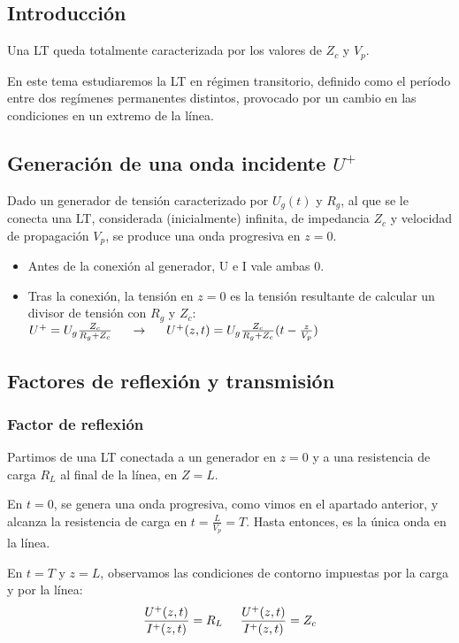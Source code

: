 \documentclass[12pt]{article}
\begin{document}
\subsection{Introducci\'on}
Una LT queda totalmente caracterizada por los valores de $Z_c$ y $V_p$.

En este tema estudiaremos la LT en r\'egimen transitorio, definido como el per\'iodo entre dos reg\'imenes permanentes distintos, provocado por un cambio en las condiciones en un extremo de la l\'inea.
\subsection{Generaci\'on de una onda incidente $U^+$}

Dado un generador de tensi\'on caracterizado por $U_g(t)$ y $R_g$, al que se le conecta una LT, considerada (inicialmente) infinita, de impedancia $Z_c$ y velocidad de propagaci\'on $V_p$, se produce una onda progresiva en $z=0$.
\begin{itemize}
	\item Antes de la conexi\'on al generador, U e I vale ambas 0.
	\item Tras la conexi\'on, la tensi\'on en $z=0$ es la tensi\'on resultante de calcular un divisor de tensi\'on con $R_g$ y $Z_c$: $U^+ = U_g\frac{Z_c}{R_g + Z_c} \hspace{0.5cm} \rightarrow \hspace{0.5cm} U^+ (z, t) = U_g\frac{Z_c}{R_g + Z_c} (t-\frac{z}{V_p})$
\end{itemize}

\subsection{Factores de reflexi\'on y transmisi\'on}
\subsubsection{Factor de reflexi\'on}
Partimos de una LT conectada a un generador en $z=0$ y a una resistencia de carga $R_L$ al final de la l\'inea, en $Z=L$.

En $t=0$, se genera una onda progresiva, como vimos en el apartado anterior, y alcanza la resistencia de carga en $t=\frac{L}{V_p}=T$. Hasta entonces, es la \'unica onda en la l\'inea.

En $t=T$ y $z=L$, observamos las condiciones de contorno impuestas por la carga y por la l\'inea:
$$\frac{U^+(z, t)}{I^+(z, t)} = R_L \hspace{0.5cm} \frac{U^+(z, t)}{I^+(z, t)} = Z_c$$
\end{document}
